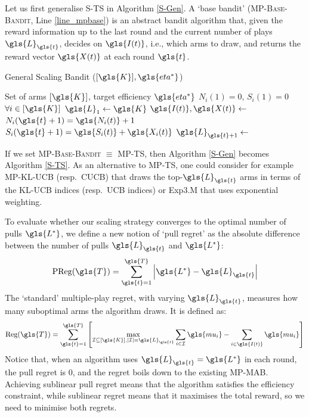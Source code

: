Let us first generalise \gls{S-TS} in Algorithm \ref{S-Gen}. 
A `base bandit' (\textsc{MP-Base-Bandit}, Line \ref{line_mpbase}) is an abstract bandit algorithm that, given the reward information up to the last round and the current number of plays $\gls{L}_{\gls{t}}$, decides on $\gls{I(t)}$, i.e., which arms to draw, and returns the reward vector $\gls{X(t)}$ at each round $\gls{t}$.

\begin{algorithm}
	\footnotesize
	\caption{General Scaling Bandit ($[\gls{K}], \gls{eta^*}$)}\label{S-Gen} 
	\begin{algorithmic}[1]
		\Require Set of arms
		$[\gls{K}]$, target efficiency $\gls{eta^*}$
		\State $\textit{N}_i(1) = 0$, $\textit{S}_i(1) = 0$ \quad $\forall i \in [\gls{K}]$ 
		\State $\gls{L}_1 \gets \gls{K}$ 
		\State $\gls{I(t)}, \gls{X(t)} \gets $   \label{line_mpbase}
		\State $N_i(\gls{t}+1) = \gls{N_i(t)} + 1$
		\State $S_i(\gls{t}+1) = \gls{S_i(t)} + \gls{X_i(t)}$
		\EndFor
		\State $\gls{L}_{\gls{t}+1} \gets$  
		\EndFor
	\end{algorithmic}
	
\end{algorithm}

If we set \textsc{MP-Base-Bandit} $\equiv$ \gls{MP-TS}, then Algorithm \ref{S-Gen} becomes Algorithm \ref{S-TS}. As an alternative to \gls{MP-TS}, one could consider for example \gls{MP-KL-UCB} (resp.\ \gls{CUCB}) that draws the top-$\gls{L}_{\gls{t}}$ arms in terms of the \gls{KL-UCB} indices (resp.\ \gls{UCB} indices) or \gls{Exp3.M} that uses exponential weighting. 

To evaluate whether our scaling strategy converges to the optimal number of pulls $\gls{L^*}$, we define a new notion of `pull regret' as the absolute difference between the number of pulls $\gls{L}_{\gls{t}}$ and $\gls{L^*}$: 
\begin{align}
\text{PReg}(\gls{T}) = \sum_{\gls{t}=1}^{\gls{T}}  \left| \gls{L^*} - \gls{L}_{\gls{t}} \right|
\end{align}
The `standard' multiple-play regret, with varying $\gls{L}_{\gls{t}}$, measures how many suboptimal arms the algorithm draws. It is defined as:
\begin{align} \label{ineq_regret}
\text{Reg}(\gls{T}) = \sum_{\gls{t}=1}^{\gls{T}}{\left[\max_{\mI \subseteq [\gls{K}], |\mI|=\gls{L}_{\gls{t}}} \sum_{i \in \mI} \gls{mu_i} - \sum_{i \in \gls{I(t)}} \gls{mu_i} \right]}
\end{align}
Notice that, when an algorithm uses $\gls{L}_{\gls{t}} = \gls{L^*}$ in each round, 
the pull regret is $0$, and the regret boils down to the existing \gls{MP-MAB}. 
Achieving sublinear pull regret means that the algorithm satisfies the efficiency constraint, while sublinear regret means that it maximises the total reward, so we need to minimise both regrets. 

